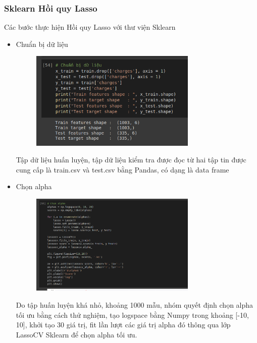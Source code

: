 \documentclass{article}
\begin{document}
	\subsubsection{Sklearn Hồi quy Lasso}
	Các bước thực hiện Hồi quy Lasso với thư viện Sklearn
	\begin{itemize}
		\item Chuẩn bị dữ liệu
		\begin{figure}[H]
			\centering
			\includegraphics[width=0.75\textwidth]{images/lasso_reg/lasso_data_preparation.png}
		\end{figure}
		Tập dữ liệu huấn luyện, tập dữ liệu kiểm tra được đọc từ hai tập tin được cung cấp là train.csv và test.csv bằng Pandas, có dạng là data frame
		\item Chọn alpha
		\begin{figure}[H]
			\centering
			\includegraphics[width=0.75\textwidth]{images/lasso_reg/lasso_reg_choose_alpha.png}
		\end{figure}
		Do tập huấn luyện khá nhỏ, khoảng 1000 mẫu, nhóm quyết định chọn alpha tối ưu bằng cách thử nghiệm, tạo logspace bằng Numpy trong khoảng [-10, 10], khởi tạo 30 giá trị, fit lần lượt các giá trị alpha đó thông qua lớp LassoCV Sklearn để chọn alpha tối ưu.
	

\end{itemize}
\end{document}
